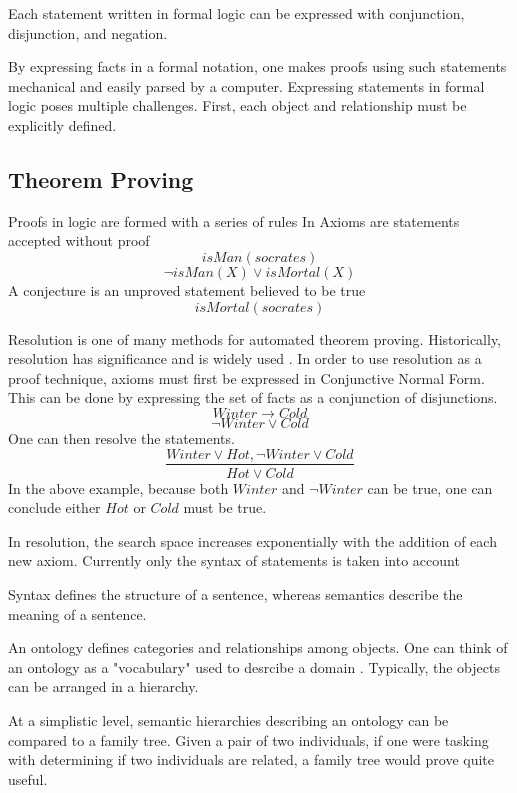 \documentclass{article}
\begin{document}
\begin{spacing}{2}
Each statement written in formal logic can be expressed with conjunction, disjunction, and negation. 

By expressing facts in a formal notation, one makes proofs using such statements mechanical and easily parsed by a computer. Expressing statements in formal logic poses multiple challenges. First, each object and relationship must be explicitly defined. 
	
\subsection{Theorem Proving}
Proofs in logic are formed with a series of rules 
In Axioms are statements accepted without proof
        \[isMan(socrates)\]
        \[\lnot isMan(X)\lor isMortal(X)\]
	    A conjecture is an unproved statement believed to be true 
	    \[isMortal(socrates)\]
	


Resolution is one of many methods for automated theorem proving. Historically, resolution has significance and is widely used \cite[51]{ertel2018introduction}.
In order to use resolution as a proof technique, axioms must first be expressed in Conjunctive Normal Form. This can be done by expressing the set of facts as a conjunction of disjunctions. 
		\[Winter \rightarrow Cold\]
		\[\lnot Winter \lor Cold\]
		One can then resolve the statements. 
		\[\frac{Winter \lor Hot, \lnot Winter \lor Cold}{Hot \lor Cold}\]
		In the above example, because both $Winter$ and $\lnot Winter $ can be true, one can conclude either $Hot$ or $Cold$ must be true. 
		

In resolution, the search space increases exponentially with the addition of each new axiom. 
Currently only the syntax of statements is taken into account

	

        Syntax defines the structure of a sentence, whereas semantics describe the meaning of a sentence. 
	

		An ontology defines categories and relationships among objects.
		One can think of an ontology as a "vocabulary" used to desrcibe a domain \cite[308]{russell2016artificial}. Typically, the objects can be arranged in a hierarchy. 
		
	At a simplistic level, semantic hierarchies describing an ontology can be compared to a family tree. Given a pair of two individuals, if one were tasking with determining if two individuals are related, a family tree would prove quite useful. 


\end{spacing}
\end{document}

